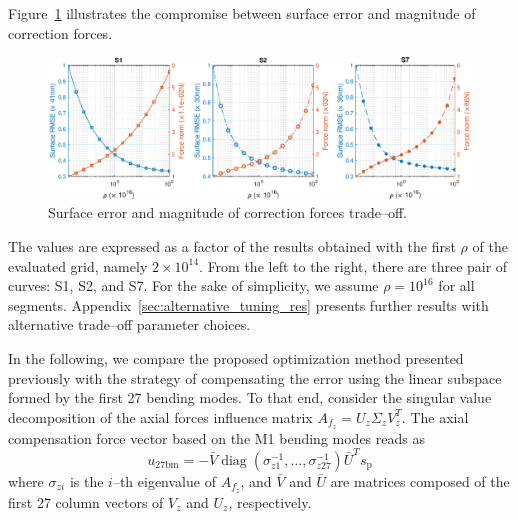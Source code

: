 \documentclass{gmto}
\DeclareMathOperator{\diag}{diag}
\begin{document}
Figure~\ref{fig:rho_tradeoff} illustrates the compromise between surface error and magnitude of correction forces. %
%
\begin{figure}[!hbt]
    \vspace{6pt}
    \centering
    \includegraphics[width=\textwidth]{./pictures/rho_tradeoff_v2.eps}
    \caption{Surface error and magnitude of correction forces trade--off.}
    \label{fig:rho_tradeoff}
\end{figure}
The values are expressed as a factor of the results obtained with the first $\rho$ of the evaluated grid, namely $2\times10^{14}$. From the left to the right, there are three pair of curves: \textsf{S1}, \textsf{S2}, and \textsf{S7}. For the sake of simplicity, we assume $\rho = 10^{16}$ for all segments. Appendix~\ref{sec:alternative_tuning_res} presents further results with alternative trade--off parameter choices.


In the following, we compare the proposed optimization method presented previously with the strategy of compensating the error using the linear subspace formed by the first 27 bending modes. To that end, consider the singular value decomposition of the axial forces influence matrix $A_{f_z} = U_z \Sigma_z V_z^T$. The axial compensation force vector based on the M1 bending modes reads as
\[
u_{27\text{bm}} = - \bar{V} \diag\left( \sigma_{z1}^{-1}, \ldots, \sigma_{z27}^{-1} \right) \bar{U}^T s_{\text{p}}
\]
where $\sigma_{zi}$ is the $i$--th eigenvalue of $A_{f_z}$, and $\bar{V}$ and $\bar{U}$ are matrices composed of the first 27 column vectors of $V_z$ and $U_z$, respectively.
\end{document}
